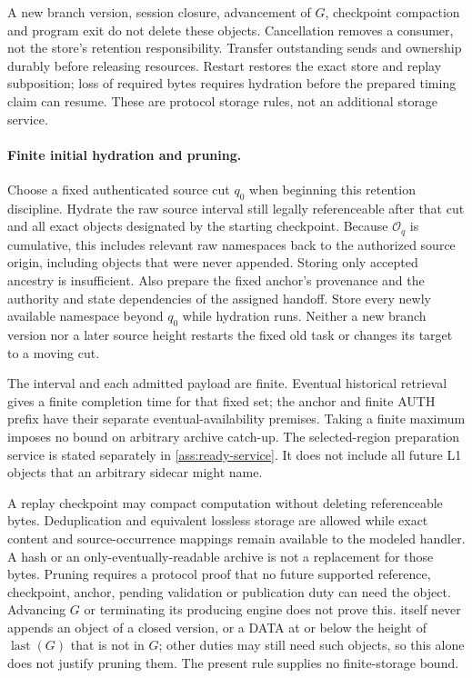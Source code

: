 \documentclass[11pt,a4paper]{article}
\newcounter{protocol}
\begin{document}
A new branch version, session closure, advancement of $G$, checkpoint
compaction and program exit do not delete these objects. Cancellation
removes a consumer, not the store's retention responsibility. Transfer
outstanding sends and ownership durably before releasing resources.
Restart restores the exact store and replay subposition; loss of required
bytes requires hydration before the prepared timing claim can resume.
These are protocol storage rules, not an additional storage service.

\paragraph{Finite initial hydration and pruning.}
\label{sec:source-hydration}
Choose a fixed authenticated source cut $q_0$ when beginning this
retention discipline. Hydrate the raw source interval still legally
referenceable after that cut and all exact objects designated by the
starting checkpoint. Because $\mathcal O_q$ is cumulative, this
includes relevant raw namespaces back to the authorized source origin,
including objects that were never appended. Storing only accepted
ancestry is insufficient. Also prepare the fixed anchor's provenance and the
authority and state dependencies of the assigned handoff.
Store every newly available namespace beyond $q_0$ while hydration
runs. Neither a new branch version nor a later source height restarts the fixed
old task or changes its target to a moving cut.

The interval and each admitted payload are finite. Eventual historical
retrieval gives a finite completion time for that fixed set; the anchor
and finite AUTH prefix have their separate eventual-availability
premises. Taking a finite maximum imposes no bound on arbitrary archive catch-up.
The selected-region preparation service is stated separately in
\cref{ass:ready-service}. It does not include all future
L1 objects that an arbitrary sidecar might name.

A replay checkpoint may compact computation without deleting
referenceable bytes. Deduplication and equivalent lossless storage are
allowed while exact content and source-occurrence mappings remain
available to the modeled handler. A hash or an only-eventually-readable
archive is not a replacement for those bytes. Pruning requires a
protocol proof that no future supported reference, checkpoint,
anchor, pending validation or publication duty can need the object.
Advancing $G$ or terminating its producing engine does not prove this.
 itself never appends an object of a closed
version, or a DATA at or below the height of $\operatorname{last}(G)$
that is not in $G$; other duties may still need such objects, so this
alone does not justify pruning them.
The present rule supplies no finite-storage bound.
\end{document}
